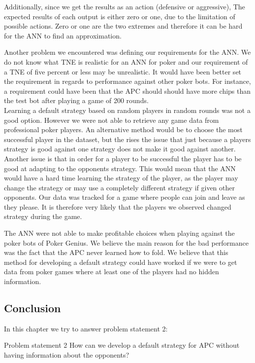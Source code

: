 Additionally, since we get the results as an action (defensive or aggressive), The expected results of each output is either zero or one, due to the limitation of possible actions. Zero or one are the two extremes and therefore it can be hard for the ANN to find an approximation. 

Another problem we encountered was defining our requirements for the ANN. We do not know what TNE is realistic for an ANN for poker and our requirement of a TNE of five percent or less may be unrealistic. It would have been better set the requirement in regards to performance against other poker bots. For instance, a requirement could have been that the APC should should have more chips than the test bot after playing a game of 200 rounds. \\

Learning a default strategy based on random players in random rounds was not a good option. However we were not able to retrieve any game data from professional poker players.
An alternative method would be to choose the most successful player in the dataset, but the rises the issue that just because a players strategy is good against one strategy does not make it good against another.
Another issue is that in order for a player to be successful the player has to be good at adapting to the opponents strategy. This would mean that the ANN would have a hard time learning the strategy of the player, as the player may change the strategy or may use a completely different strategy if given other opponents. Our data was tracked for a game where people can join and leave as they please. It is therefore very likely that the players we observed changed strategy during the game. 

The ANN were not able to make profitable choices when playing against the poker bots of Poker Genius. We believe the main reason for the bad performance was the fact that the APC never learned how to fold. We believe that this method for developing a default strategy could have worked if we were to get data from poker games where at least one of the players had no hidden information.

\subsection{Conclusion}
In this chapter we try to answer problem statement 2:

\vspace{4mm}
\begin{statementBox2}{Problem statement 2}
How can we develop a default strategy for APC without having information about the opponents?
\end{statementBox2}
\vspace{4mm}

